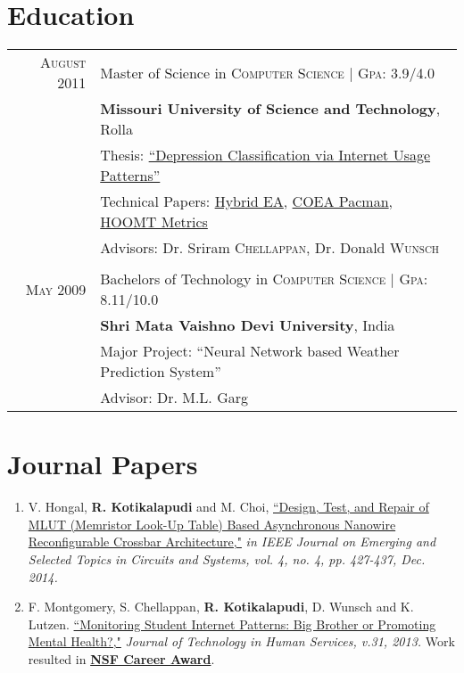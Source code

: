 \documentclass[a4paper,11pt]{article}
\begin{document}
\section{Education}
\begin{tabularx}{0.95\textwidth}{rX}	
  \textsc{August} 2011 & Master of Science in \textsc{Computer Science} | \normalsize \textsc{Gpa}: 3.9/4.0 \\
& \normalsize \textbf{Missouri University of Science and Technology}, Rolla \\
& Thesis: \href{https://github.com/raghakot/papers/blob/master/thesis.pdf}{``Depression Classification via Internet Usage Patterns''} \\
& Technical Papers: \href{https://github.com/raghakot/papers/blob/master/SPSS.pdf}{Hybrid EA}, \href{https://github.com/raghakot/papers/blob/master/coea_pacman.pdf}{COEA Pacman}, \href{https://github.com/raghakot/papers/blob/master/hoomt_metrics.pdf}{HOOMT Metrics} \\
& \small Advisors: Dr. Sriram \textsc{Chellappan}, Dr. Donald \textsc{Wunsch}\\
& \\
  \textsc{May} 2009 & Bachelors of Technology in \textsc{Computer Science} | \normalsize \textsc{Gpa}: 8.11/10.0 \\
& \normalsize \textbf{Shri Mata Vaishno Devi University}, India \\
& Major Project: ``Neural Network based Weather Prediction System'' \\
& \small Advisor: Dr. M.L. Garg \\
\end{tabularx}

\section{Journal Papers}
\begin{enumerate}[1)]
    \item V. Hongal, \textbf{R. Kotikalapudi} and M. Choi, \href{http://ieeexplore.ieee.org/stamp/stamp.jsp?tp=&arnumber=6924808&isnumber=6970761}{``Design, Test, and Repair of MLUT (Memristor Look-Up Table) Based Asynchronous Nanowire Reconfigurable Crossbar Architecture,"} \emph{in IEEE Journal on Emerging and Selected Topics in Circuits and Systems, vol. 4, no. 4, pp. 427-437, Dec. 2014.}

    \item F. Montgomery, S. Chellappan,\textbf{ R. Kotikalapudi}, D. Wunsch and K. Lutzen. \href{http://www.tandfonline.com/doi/pdf/10.1080/15228835.2012.756600}{``Monitoring Student Internet Patterns: Big Brother or Promoting Mental Health?,"} \emph{Journal of Technology in Human Services, v.31, 2013.} Work resulted in  \textbf{\href{http://www.nsf.gov/awardsearch/showAward?AWD_ID=1254117}{NSF Career Award}}.
\end{enumerate}
\end{document}

